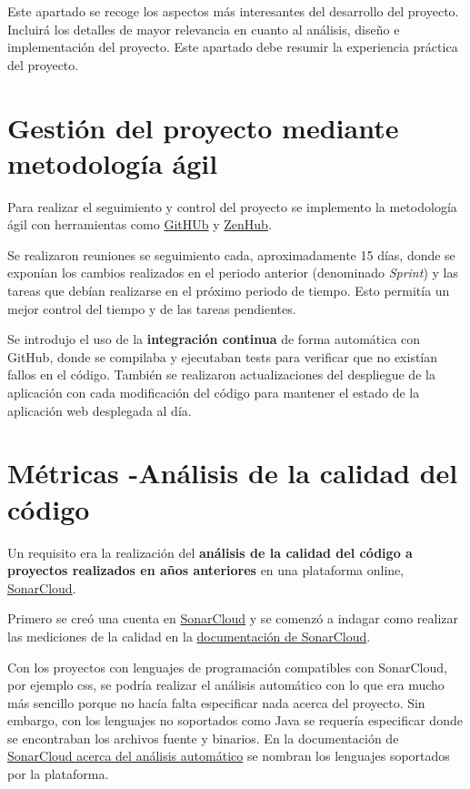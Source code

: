 
Este apartado se recoge los aspectos más interesantes del desarrollo del proyecto. Incluirá los detalles de mayor relevancia en cuanto al análisis, diseño e implementación del proyecto. Este apartado debe resumir la experiencia práctica del proyecto.

\section{Gestión del proyecto mediante metodología ágil}
Para realizar el seguimiento y control del proyecto se implemento la metodología ágil con herramientas como \href{https://github.com/}{GitHUb} y \href{https://www.zenhub.com/}{ZenHub}. 

Se realizaron reuniones se seguimiento cada, aproximadamente 15 días, donde se exponían los cambios realizados en el periodo anterior (denominado \emph{Sprint}) y las tareas que debían realizarse en el próximo periodo de tiempo. Esto permitía un mejor control del tiempo y de las tareas pendientes. 

Se introdujo el uso de la \textbf{integración continua} de forma automática con GitHub, donde se compilaba y ejecutaban tests para verificar que no existían fallos en el código. También se realizaron actualizaciones del despliegue de la aplicación con cada modificación del código para mantener el estado de la aplicación web desplegada al día.  

\section{Métricas -Análisis de la calidad del código}
Un requisito era la realización del \textbf{análisis de la calidad del código a proyectos realizados en años anteriores} en una plataforma online, \href{https://sonarcloud.io/organizations/dbo1001/projects/}{SonarCloud}. 

Primero se creó una cuenta en \href{https://sonarcloud.io}{SonarCloud} y se comenzó a indagar como realizar las mediciones de la calidad en la \href{https://sonarcloud.io/documentation}{documentación de SonarCloud}. 

Con los proyectos con lenguajes de programación compatibles con SonarCloud, por ejemplo css, se podría realizar el análisis automático con lo que era mucho más sencillo porque no hacía falta especificar nada acerca del proyecto. Sin embargo, con los lenguajes no soportados como Java se requería especificar donde se encontraban los archivos fuente y binarios.
En la documentación de \href{https://sonarcloud.io/documentation/analysis/automatic-analysis/}{SonarCloud acerca del análisis automático} se nombran los lenguajes soportados por la plataforma.
 
